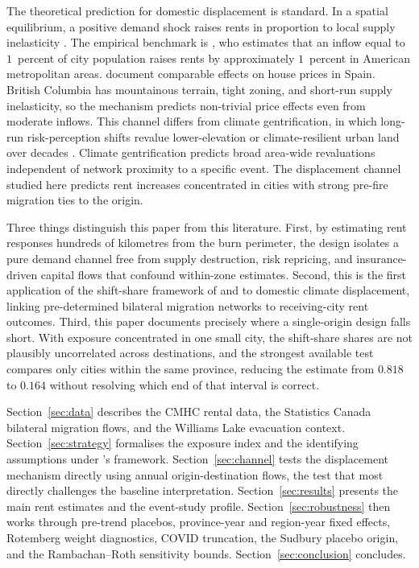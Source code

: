 \documentclass[12pt]{article}
\begin{document}
The theoretical prediction for domestic displacement is standard. In a
spatial equilibrium, a positive demand shock raises rents in proportion to
local supply inelasticity \citep{saiz2010}. The empirical benchmark is
\citet{saiz2007}, who estimates that an inflow equal to $1$~percent of city
population raises rents by approximately $1$~percent in American metropolitan
areas. \citet{gonzalez2013} document comparable effects on house prices in Spain.
British Columbia has mountainous terrain, tight zoning, and short-run supply
inelasticity, so the mechanism predicts non-trivial price effects even from
moderate inflows. This channel differs from climate gentrification, in which
long-run risk-perception shifts revalue lower-elevation or climate-resilient
urban land over decades \citep{keenan2018, bernstein2019}. Climate gentrification
predicts broad area-wide revaluations independent of network proximity to a
specific event. The displacement channel studied here predicts rent increases
concentrated in cities with strong pre-fire migration ties to the origin.

Three things distinguish this paper from this literature. First, by estimating
rent responses hundreds of kilometres from the burn perimeter, the design
isolates a pure demand channel free from supply destruction, risk repricing,
and insurance-driven capital flows that confound within-zone estimates. Second,
this is the first application of the shift-share framework of
\citet{goldsmith2020} and \citet{borusyak2022} to domestic climate displacement,
linking pre-determined bilateral migration networks to receiving-city rent
outcomes. Third, this paper documents precisely where a single-origin design
falls short. With exposure concentrated in one small city, the shift-share
shares are not plausibly uncorrelated across destinations, and the strongest
available test compares only cities within the same province, reducing the
estimate from $0.818$ to $0.164$ without resolving which end of that interval
is correct.

Section~\ref{sec:data} describes the CMHC rental data, the Statistics
Canada bilateral migration flows, and the Williams Lake evacuation context.
Section~\ref{sec:strategy} formalises the exposure index and the
identifying assumptions under \citeauthor{goldsmith2020}'s framework.
Section~\ref{sec:channel} tests the displacement mechanism directly using
annual origin-destination flows, the test that most directly challenges the
baseline interpretation. Section~\ref{sec:results} presents the main rent
estimates and the event-study profile. Section~\ref{sec:robustness} then works through pre-trend placebos,
province-year and region-year fixed effects, Rotemberg weight diagnostics,
COVID truncation, the Sudbury placebo origin, and the Rambachan--Roth
sensitivity bounds.
Section~\ref{sec:conclusion} concludes.
\end{document}
